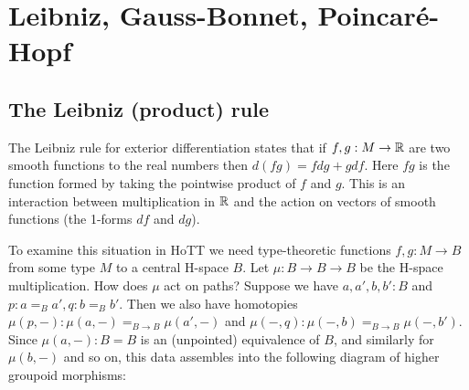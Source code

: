 \section{Leibniz, Gauss-Bonnet, Poincaré-Hopf}

\subsection{The Leibniz (product) rule}

The Leibniz rule for exterior differentiation states that if \( f, g:M\to \mathbb{R} \) are two smooth functions to the real numbers then \( d(fg) = fdg + gdf \). Here \( fg \) is the function formed by taking the pointwise product of \( f \) and \( g \). This is an interaction between multiplication in \( \mathbb{R} \) and the action on vectors of smooth functions (the 1-forms \( df \) and \( dg \)). 

To examine this situation in HoTT we need type-theoretic functions \( f, g:M\to B \) from some type \( M \) to a central H-space \( B \). Let \( \mu:B\to B\to B \) be the H-space multiplication. How does \( \mu \) act on paths? Suppose we have \( a, a', b, b':B \) and \( p:a=_B a', q:b=_B b' \). Then we also have homotopies \( \mu(p, -):\mu(a, -)=_{B\to B}\mu(a', -) \) and \( \mu(-,q):\mu(-,b)=_{B\to B}\mu(-,b'). \) Since \( \mu(a, -):B=B \) is an (unpointed) equivalence of \( B \), and similarly for \( \mu(b, -) \) and so on, this data assembles into the following diagram of higher groupoid morphisms:

\begin{center}
\end{center}

